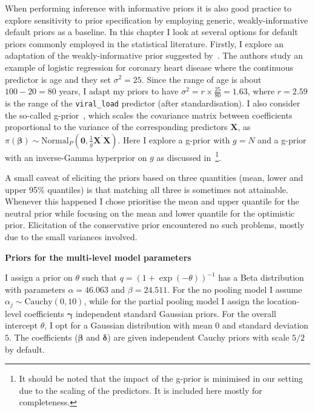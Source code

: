 When performing inference with informative priors it is also good practice to explore sensitivity to prior specification by employing generic, weakly-informative default priors as a baseline.
In this chapter I look at several options for default priors commonly employed in the statistical literature.
Firstly, I explore an adaptation of the weakly-informative prior suggested by~\cite{Seaman2012}.
The authors study an example of logistic regression for coronary heart disease where the continuous predictor is age and they set $\sigma^2 = 25$.
Since the range of age is about $100-20 = 80$ years, I adapt my priors to have $\sigma^2 = r \times \frac{25}{80} = 1.63$, where $r = 2.59$ is the range of the \verb|viral_load| predictor (after standardisation).
I also consider the so-called g-prior~\citep{Zellner1986}, which scales the covariance matrix between coefficients proportional to the variance of the corresponding predictors $\boldsymbol X$, as $\pi(\boldsymbol\beta) \sim \text{Normal}_P(\boldsymbol 0, \frac{1}{g} \boldsymbol X^\prime\boldsymbol X)$.
Here I explore a g-prior with $g = N$ and a g-prior with an inverse-Gamma hyperprior on $g$ as discussed in~\cite{Liang2008}\footnote{It should be noted that the impact of the g-prior is minimised in our setting due to the scaling of the predictors. It is included here mostly for completeness.}.

A small caveat of eliciting the priors based on three quantities (mean, lower and upper 95\% quantiles) is that matching all three is sometimes not attainable.
Whenever this happened I chose prioritise the mean and upper quantile for the neutral prior while focusing on the mean and lower quantile for the optimistic prior.
Elicitation  of the conservative prior encountered no such problems, mostly due to the small variances involved.

\textbf{Priors for the multi-level model parameters}

I assign a prior on $\theta$ such that $q = (1 + \exp(-\theta))^{-1}$ has a Beta distribution with parameters $\alpha = 46.063$ and $\beta = 24.511$.
For the no pooling model I assume $\alpha_j\sim \text{Cauchy}(0, 10)$, while for the partial pooling model I assign the location-level coefficients $\boldsymbol \gamma$ independent standard Gaussian priors.
For the overall intercept $\theta$, I opt for a Gaussian distribution with mean $0$ and standard deviation $5$.
The coefficients ($\boldsymbol\beta$ and $\boldsymbol\delta$) are given independent Cauchy priors with scale $5/2$ by default.

